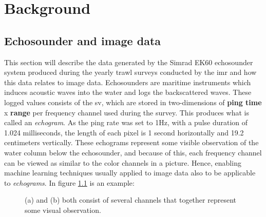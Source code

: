 \chapter{Background}
\section{Echosounder and image data}
    This section will describe the data generated by the Simrad EK60 echosounder system produced during the yearly trawl surveys conducted by the \gls{imr}\cite{johnsen2017collective} and how this data relates to image data. Echosounders are maritime instruments which induces acoustic waves into the water and logs the backscattered waves\cite{brautaset2020acoustic}. These logged values consists of the \gls{sv}, which are stored in two-dimensions of \textbf{ping time} x \textbf{range} per frequency channel used during the survey. This produces what is called an \textit{echogram}. As the ping rate was set to 1Hz\cite{choi2021semi}, with a pulse duration of 1.024 milliseconds, the length of each pixel is 1 second horizontally and 19.2 centimeters vertically. These echograms represent some visible observation of the water column below the echosounder, and because of this, each frequency channel can be viewed as similar to the color channels in a picture. Hence, enabling machine learning techniques usually applied to image data also to be applicable to \textit{echograms}. In figure \ref{accoustic data and color channels fig} is an example:

    \begin{figure}[H]
        \centering
        
        
        
        
        \caption[Frequency channels and color channels]{(a) and (b) both consist of several channels that together represent some visual observation.}
        \label{accoustic data and color channels fig}
        
        \end{figure}
    
